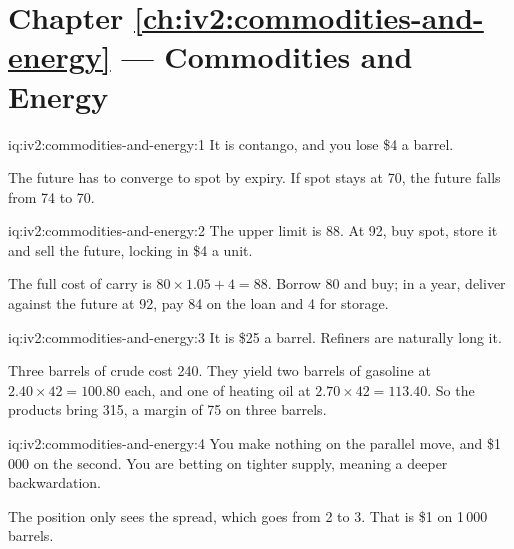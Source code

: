 \section*{Chapter \ref{ch:iv2:commodities-and-energy} --- Commodities and Energy}

\begin{solution}{iq:iv2:commodities-and-energy:1}
It is contango, and you lose \$4 a barrel.

The future has to converge to spot by expiry. If spot stays at 70, the future falls from 74 to 70.

\end{solution}

\begin{solution}{iq:iv2:commodities-and-energy:2}
The upper limit is 88. At 92, buy spot, store it and sell the future, locking in \$4 a unit.

The full cost of carry is $80 \times 1.05 + 4 = 88$. Borrow 80 and buy; in a year, deliver against the future at 92, pay 84 on the loan and 4 for storage.

\end{solution}

\begin{solution}{iq:iv2:commodities-and-energy:3}
It is \$25 a barrel. Refiners are naturally long it.

Three barrels of crude cost 240. They yield two barrels of gasoline at $2.40 \times 42 = 100.80$ each, and one of heating oil at $2.70 \times 42 = 113.40$. So the products bring 315, a margin of 75 on three barrels.

\end{solution}

\begin{solution}{iq:iv2:commodities-and-energy:4}
You make nothing on the parallel move, and \$1\,000 on the second. You are betting on tighter supply, meaning a deeper backwardation.

The position only sees the spread, which goes from 2 to 3. That is \$1 on 1\,000 barrels.

\end{solution}

